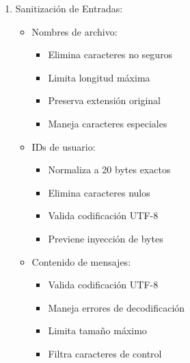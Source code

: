 \documentclass[12pt]{article}
\begin{document}
\begin{enumerate}
    \item Sanitización de Entradas:
    \begin{itemize}
        \item Nombres de archivo:
        \begin{itemize}
            \item Elimina caracteres no seguros
            \item Limita longitud máxima
            \item Preserva extensión original
            \item Maneja caracteres especiales
        \end{itemize}
        \item IDs de usuario:
        \begin{itemize}
            \item Normaliza a 20 bytes exactos
            \item Elimina caracteres nulos
            \item Valida codificación UTF-8
            \item Previene inyección de bytes
        \end{itemize}
        \item Contenido de mensajes:
        \begin{itemize}
            \item Valida codificación UTF-8
            \item Maneja errores de decodificación
            \item Limita tamaño máximo
            \item Filtra caracteres de control
        \end{itemize}
    \end{itemize}


\end{enumerate}
\end{document}
